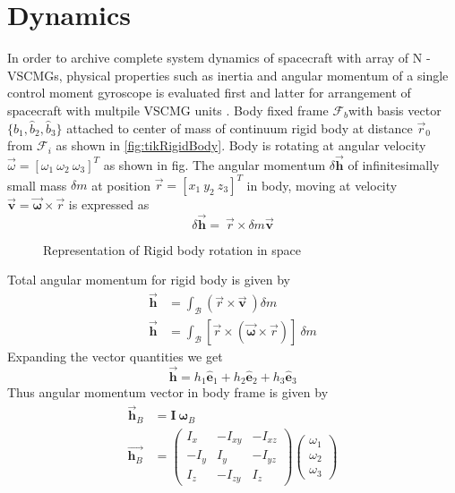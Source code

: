 \section{Dynamics}
In order to archive complete system dynamics of spacecraft with array of N - VSCMGs, physical properties such as inertia and angular momentum of a single control moment gyroscope is evaluated first and latter for arrangement of spacecraft with multpile VSCMG units . Body fixed frame $\displaystyle \mathcal{F}_{b}$with basis vector $\displaystyle \{\hat{b}_{1} ,\hat{b}_{2} ,\hat{b}_{3}\}$ attached to center of mass of continuum rigid body at distance $\displaystyle \vec{r}_{0}$ from $\displaystyle \mathcal{F}_{i}$ as shown in \autoref{fig:tikRigidBody}. Body is rotating at angular velocity $\displaystyle \vec{\omega } =[ \omega _{1} \ \omega _{2} \ \omega _{3}]^{T}$ as shown in fig. The angular momentum $\displaystyle \delta \vec{\mathbf{h}}$ of infinitesimally small mass $\displaystyle \delta m$ at position $\displaystyle \vec{r} =[ x_{1} \ y_{2} \ z_{3}]^{T}$ in body, moving at velocity $\displaystyle \mathbf{\vec{v}} =\vec{\mathbf{\omega }} \times \vec{r}$ is expressed as
\begin{equation*}
\delta \vec{\mathbf{h}} =\ \vec{r} \times \delta m\mathbf{\vec{v}}
\end{equation*}
\begin{figure}[!h]
    \centering
    
    \caption{Representation of Rigid body rotation in space}
    \label{fig:tikRigidBody}
\end{figure}
Total angular momentum for rigid body is given by
\begin{equation*}
\begin{aligned}
\vec{\mathbf{h}} & =\int _{\mathcal{B}}(\vec{r} \times \mathbf{\vec{v}} \ ) \delta m\\
\vec{\mathbf{h}} & =\int _{\mathcal{B}}[\vec{r} \times (\vec{\mathbf{\omega }} \times \vec{r})] \ \delta m
\end{aligned}
\end{equation*}
Expanding the vector quantities we get
\begin{equation*}
\vec{\mathbf{h}} =h_{1}\hat{\mathbf{e}}_{1} +h_{2}\hat{\mathbf{e}}_{2} +h_{3}\hat{\mathbf{e}}_{3}
\end{equation*}
Thus angular momentum vector in body frame is given by
\begin{equation}
\begin{aligned}
\vec{\mathbf{h}}_{B} & =\mathbf{I\ \omega }_{B}\\
\overrightarrow{\mathbf{h}_{B}} & =\begin{pmatrix}
I_{x} & -I_{xy} & -I_{xz}\\
-I_{y} & I_{y} & -I_{yz}\\
I_{z} & -I_{zy} & I_{z}
\end{pmatrix}\begin{pmatrix}
\omega _{1}\\
\omega _{2}\\
\omega _{3}
\end{pmatrix}
\end{aligned}
\end{equation}
